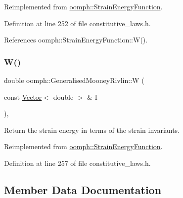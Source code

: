Reimplemented from \hyperlink{classoomph_1_1StrainEnergyFunction_a76cadaefaa89b93793c893f1302bd68a}{oomph\+::\+Strain\+Energy\+Function}.



Definition at line 252 of file constitutive\+\_\+laws.\+h.



References oomph\+::\+Strain\+Energy\+Function\+::\+W().

\mbox{\label{classoomph_1_1GeneralisedMooneyRivlin_a2edff387e97632febd90938b27a30a14}} 
\subsubsection{\texorpdfstring{W()}{W()}\hspace{0.1cm}{\footnotesize\ttfamily [2/2]}}
{\footnotesize\ttfamily double oomph\+::\+Generalised\+Mooney\+Rivlin\+::W (\begin{DoxyParamCaption}\item[{const \hyperlink{classoomph_1_1Vector}{Vector}$<$ double $>$ \&}]{I }\end{DoxyParamCaption})\hspace{0.3cm}{\ttfamily [inline]}, {\ttfamily [virtual]}}



Return the strain energy in terms of the strain invariants. 



Reimplemented from \hyperlink{classoomph_1_1StrainEnergyFunction_a99df34610d4542568f65c568ae3a908f}{oomph\+::\+Strain\+Energy\+Function}.



Definition at line 257 of file constitutive\+\_\+laws.\+h.



\subsection{Member Data Documentation}
\mbox{\label{classoomph_1_1GeneralisedMooneyRivlin_aebb4709747e2855ddaa8b455d50d0174}} 
